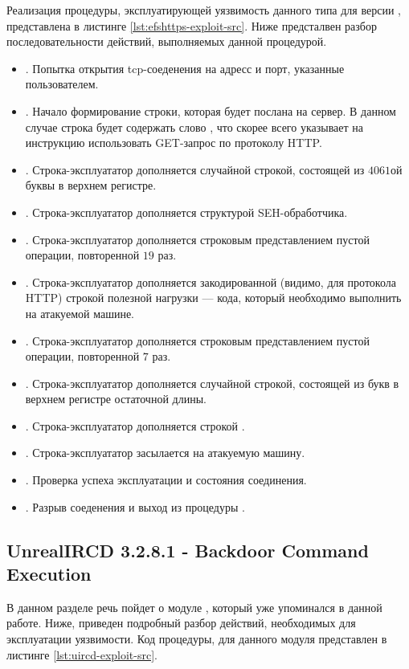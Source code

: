 Реализация процедуры, эксплуатирующей уязвимость данного типа для  версии , представлена в листинге \ref{lst:efshttps-exploit-src}. Ниже предсталвен разбор 
последовательности действий, выполняемых данной процедурой.
\begin{itemize}
    \item {}. Попытка открытия tcp-соеденения на адресс и порт, указанные пользователем.
    \item {}. Начало формирование строки, которая будет послана на сервер. В данном случае строка будет содержать слово , что скорее всего указывает на инструкцию использовать GET-запрос по протоколу
        HTTP.
    \item {}. Строка-эксплуататор дополняется случайной строкой, состоящей из $4061$ой буквы в верхнем регистре. 
    \item {}. Строка-эксплуататор дополняется структурой SEH-обработчика.
    \item {}. Строка-эксплуататор дополняется строковым представлением пустой операции, повторенной $19$ раз.
    \item {}. Строка-эксплуататор дополняется закодированной (видимо, для протокола HTTP) строкой полезной нагрузки --- кода, который необходимо выполнить на атакуемой машине.
    \item {}. Строка-эксплуататор дополняется строковым представлением пустой операции, повторенной $7$ раз.
    \item {}. Строка-эксплуататор дополняется случайной строкой, состоящей из букв в верхнем регистре остаточной длины. 
    \item {}. Строка-эксплуататор дополняется строкой . 
    \item {}. Строка-эксплуататор засылается на атакуемую машину.
    \item {}. Проверка успеха эксплуатации и состояния соединения.
    \item {}. Разрыв соеденения и выход из процедуры .
\end{itemize}

\subsection{UnrealIRCD 3.2.8.1 - Backdoor Command Execution}

В данном разделе речь пойдет о модуле , который уже упоминался в данной работе. Ниже, приведен подробный разбор действий, необходимых для эксплуатации уязвимости. Код процедуры, 
 для данного модуля представлен в листинге \ref{lst:uircd-exploit-src}.

